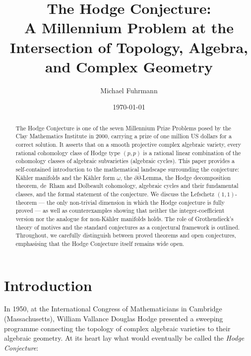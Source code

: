 \documentclass[12pt,a4paper]{amsart}
\theoremstyle{definition}
\theoremstyle{remark}
\begin{document}
\title{The Hodge Conjecture:\\
A Millennium Problem at the Intersection of Topology, Algebra, and Complex Geometry}

\author{Michael Fuhrmann}
\address{Specialist Mathematics Project, Build 147}
\date{\today}

\begin{abstract}
The Hodge Conjecture is one of the seven Millennium Prize Problems posed by the Clay
Mathematics Institute in 2000, carrying a prize of one million US dollars for a
correct solution. It asserts that on a smooth projective complex algebraic variety,
every rational cohomology class of Hodge type $(p,p)$ is a rational linear combination
of the cohomology classes of algebraic subvarieties (algebraic cycles). This paper
provides a self-contained introduction to the mathematical landscape surrounding the
conjecture: Kähler manifolds and the Kähler form $\omega$, the $\partial\bar\partial$-Lemma,
the Hodge decomposition theorem, de~Rham and Dolbeault cohomology, algebraic cycles
and their fundamental classes, and the formal statement of the conjecture. We discuss
the Lefschetz $(1,1)$-theorem — the only non-trivial dimension in which the Hodge
conjecture is fully proved — as well as counterexamples showing that neither the
integer-coefficient version nor the analogue for non-Kähler manifolds holds. The role
of Grothendieck's theory of motives and the standard conjectures as a conjectural
framework is outlined. Throughout, we carefully distinguish between proved theorems
and open conjectures, emphasising that the Hodge Conjecture itself remains wide open.
\end{abstract}

\maketitle

\tableofcontents

\section{Introduction}
\label{sec:intro}

In 1950, at the International Congress of Mathematicians in Cambridge (Massachusetts),
William Vallance Douglas Hodge presented a sweeping programme connecting the topology
of complex algebraic varieties to their algebraic geometry. At its heart lay what
would eventually be called the \emph{Hodge Conjecture}:
\end{document}
